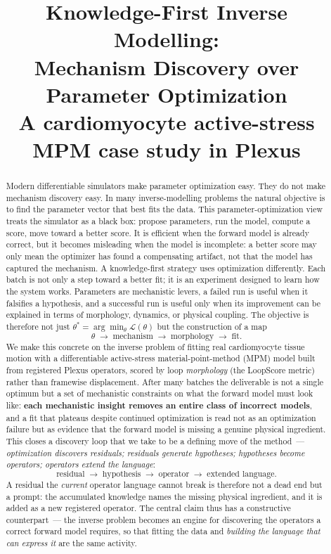 \documentclass[11pt]{article}
\title{Knowledge-First Inverse Modelling:\\ Mechanism Discovery over Parameter Optimization\\[4pt]
\large A cardiomyocyte active-stress MPM case study in Plexus}
\author{}
\date{}
\begin{document}
\maketitle

\begin{abstract}
Modern differentiable simulators make parameter optimization easy. They do not make mechanism discovery easy. In many inverse-modelling problems the natural objective is to find the parameter vector that best fits the data. This parameter-optimization view treats the simulator as a black box: propose parameters, run the model, compute a score, move toward a better score. It is efficient when the forward model is already correct, but it becomes misleading when the model is incomplete: a better score may only mean the optimizer has found a compensating artifact, not that the model has captured the mechanism. A knowledge-first strategy uses optimization differently. Each batch is not only a step toward a better fit; it is an experiment designed to learn how the system works. Parameters are mechanistic levers, a failed run is useful when it falsifies a hypothesis, and a successful run is useful only when its improvement can be explained in terms of morphology, dynamics, or physical coupling. The objective is therefore not just $\theta^* = \arg\min_\theta \mathcal{L}(\theta)$ but the construction of a map
\[
\theta \;\longrightarrow\; \text{mechanism} \;\longrightarrow\; \text{morphology} \;\longrightarrow\; \text{fit}.
\]
We make this concrete on the inverse problem of fitting real cardiomyocyte tissue motion with a differentiable active-stress material-point-method (MPM) model built from registered Plexus operators, scored by loop \emph{morphology} (the LoopScore metric) rather than framewise displacement. After many batches the deliverable is not a single optimum but a set of mechanistic constraints on what the forward model must look like: \textbf{each mechanistic insight removes an entire class of incorrect models}, and a fit that plateaus despite continued optimization is read not as an optimization failure but as evidence that the forward model is missing a genuine physical ingredient. This closes a discovery loop that we take to be a defining move of the method~--- \emph{optimization discovers residuals; residuals generate hypotheses; hypotheses become operators; operators extend the language}:
\[
\text{residual} \;\longrightarrow\; \text{hypothesis} \;\longrightarrow\; \text{operator} \;\longrightarrow\; \text{extended language}.
\]
A residual the \emph{current} operator language cannot break is therefore not a dead end but a prompt: the accumulated knowledge names the missing physical ingredient, and it is added as a new registered operator. The central claim thus has a constructive counterpart~--- the inverse problem becomes an engine for discovering the operators a correct forward model requires, so that fitting the data and \emph{building the language that can express it} are the same activity.
\end{abstract}
\end{document}
